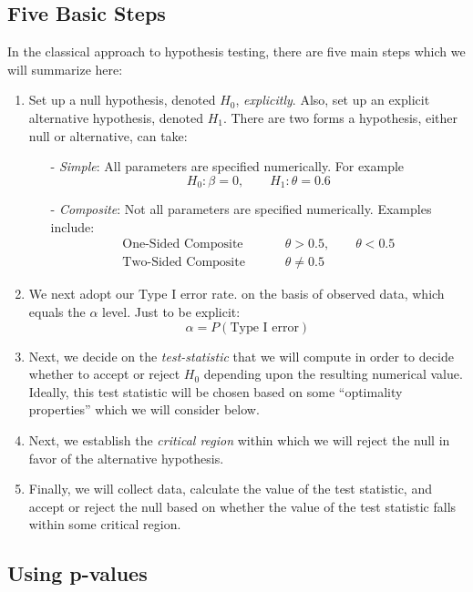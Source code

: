 \documentclass[a4paper,12pt]{scrartcl}
\begin{document}
\subsection{Five Basic Steps}

In the classical approach to hypothesis testing, there are five
main steps which we will summarize here:
\begin{enumerate}
   \item Set up a null hypothesis, denoted $H_0$, \emph{explicitly}.
      Also, set up an explicit alternative hypothesis, denoted
      $H_1$. There are two forms a hypothesis, either null or
      alternative, can take:
      \begin{itemize}
	 \item[-] {\sl Simple}: All parameters are specified
	    numerically. For example
	    \[ H_0: \beta = 0, \qquad H_1:\theta = 0.6\]
	 \item[-] {\sl Composite}: Not all parameters are specified
	    numerically. Examples include:
	    \begin{align*}
	       \text{One-Sided Composite } \qquad& \theta > 0.5,
	       \qquad \theta < 0.5\\
	       \text{Two-Sided Composite } \qquad& \theta \neq 0.5
	    \end{align*}
      \end{itemize}
   \item We next adopt our Type I error rate.
      on the basis of observed data,  which equals the
      $\alpha$ level. Just to be explicit:
	 \[ \alpha = P(\text{Type I error}) \]
   \item Next, we decide on the \emph{test-statistic} that we
      will compute in order to decide whether to accept or reject
      $H_0$ depending upon the resulting numerical value. Ideally,
      this test statistic will be chosen based on some
      ``optimality properties'' which we will consider below.
   \item Next, we establish the \emph{critical region} within
      which we will reject the null in favor of the alternative
      hypothesis.
   \item Finally, we will collect data, calculate the value of the
      test statistic, and accept or reject the null based on
      whether the value of the test statistic falls within some
      critical region.
\end{enumerate}

\subsection{Using p-values}
\end{document}

